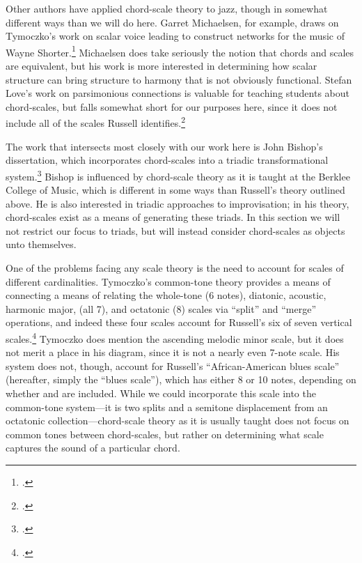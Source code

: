Other authors have applied chord-scale theory to jazz, though in somewhat
different ways than we will do here. Garret Michaelsen, for example, draws on
Tymoczko's work on scalar voice leading to construct networks for the music of
Wayne Shorter.\footcite{michaelsen:2012} Michaelsen does take seriously the
notion that chords and scales are equivalent, but his work is more interested
in determining how scalar structure can bring structure to harmony that is not
obviously functional. Stefan Love's work on parsimonious connections is
valuable for teaching students about chord-scales, but falls somewhat short
for our purposes here, since it does not include all of the scales Russell
identifies.\footcite{love:2009}

The work that intersects most closely with our work here is John Bishop's
dissertation, which incorporates chord-scales into a triadic transformational
system.\footcite{bishop:2012} Bishop is influenced by chord-scale theory as
it is taught at the Berklee College of Music, which is different in some ways
than Russell's theory outlined above. He is also interested in
triadic approaches to improvisation; in his theory, chord-scales exist as a
means of generating these triads. In this section we will not
restrict our focus to triads, but will instead consider chord-scales as
objects unto themselves.

One of the problems facing any scale theory is the need to account for scales
of different cardinalities. Tymoczko's common-tone theory provides a means of
connecting a means of relating the whole-tone (6 notes), diatonic, acoustic,
harmonic major, (all 7), and octatonic (8) scales via ``split'' and ``merge''
operations, and indeed these four scales account for Russell's six of seven
vertical scales.\footcite[134--35]{tymoczko:2011} Tymoczko does mention the
ascending melodic minor scale, but it does not merit a place in his diagram,
since it is not a nearly even 7-note scale. His system does not, though,
account for Russell's ``African-American blues scale'' (hereafter,
simply the ``blues scale''), which has either 8 or 10 notes, depending on
whether  and \nat{} are included. While we could incorporate this scale into
the common-tone system---it is two splits and a semitone displacement from an
octatonic collection---chord-scale theory as it is usually taught does not
focus on common tones between chord-scales, but rather on determining what
scale captures the sound of a particular chord.


